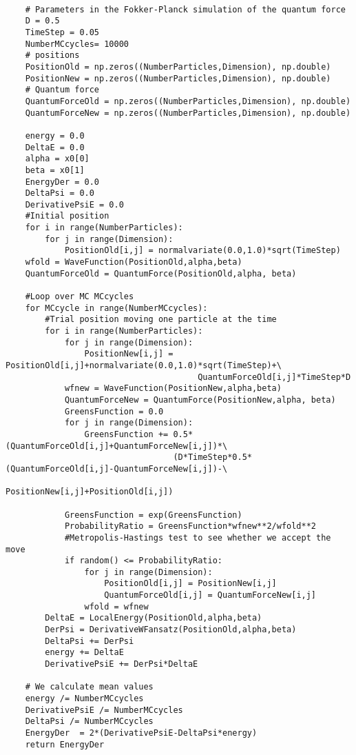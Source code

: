 \documentclass[%
oneside,                 %
final,                   %
10pt]{article}
\begin{document}
\begin{verbatim}
    
    # Parameters in the Fokker-Planck simulation of the quantum force
    D = 0.5
    TimeStep = 0.05
    NumberMCcycles= 10000
    # positions
    PositionOld = np.zeros((NumberParticles,Dimension), np.double)
    PositionNew = np.zeros((NumberParticles,Dimension), np.double)
    # Quantum force
    QuantumForceOld = np.zeros((NumberParticles,Dimension), np.double)
    QuantumForceNew = np.zeros((NumberParticles,Dimension), np.double)

    energy = 0.0
    DeltaE = 0.0
    alpha = x0[0]
    beta = x0[1]
    EnergyDer = 0.0
    DeltaPsi = 0.0
    DerivativePsiE = 0.0 
    #Initial position
    for i in range(NumberParticles):
        for j in range(Dimension):
            PositionOld[i,j] = normalvariate(0.0,1.0)*sqrt(TimeStep)
    wfold = WaveFunction(PositionOld,alpha,beta)
    QuantumForceOld = QuantumForce(PositionOld,alpha, beta)

    #Loop over MC MCcycles
    for MCcycle in range(NumberMCcycles):
        #Trial position moving one particle at the time
        for i in range(NumberParticles):
            for j in range(Dimension):
                PositionNew[i,j] = PositionOld[i,j]+normalvariate(0.0,1.0)*sqrt(TimeStep)+\
                                       QuantumForceOld[i,j]*TimeStep*D
            wfnew = WaveFunction(PositionNew,alpha,beta)
            QuantumForceNew = QuantumForce(PositionNew,alpha, beta)
            GreensFunction = 0.0
            for j in range(Dimension):
                GreensFunction += 0.5*(QuantumForceOld[i,j]+QuantumForceNew[i,j])*\
	                              (D*TimeStep*0.5*(QuantumForceOld[i,j]-QuantumForceNew[i,j])-\
                                      PositionNew[i,j]+PositionOld[i,j])
      
            GreensFunction = exp(GreensFunction)
            ProbabilityRatio = GreensFunction*wfnew**2/wfold**2
            #Metropolis-Hastings test to see whether we accept the move
            if random() <= ProbabilityRatio:
                for j in range(Dimension):
                    PositionOld[i,j] = PositionNew[i,j]
                    QuantumForceOld[i,j] = QuantumForceNew[i,j]
                wfold = wfnew
        DeltaE = LocalEnergy(PositionOld,alpha,beta)
        DerPsi = DerivativeWFansatz(PositionOld,alpha,beta)
        DeltaPsi += DerPsi
        energy += DeltaE
        DerivativePsiE += DerPsi*DeltaE
            
    # We calculate mean values
    energy /= NumberMCcycles
    DerivativePsiE /= NumberMCcycles
    DeltaPsi /= NumberMCcycles
    EnergyDer  = 2*(DerivativePsiE-DeltaPsi*energy)
    return EnergyDer



\end{verbatim}
\end{document}
